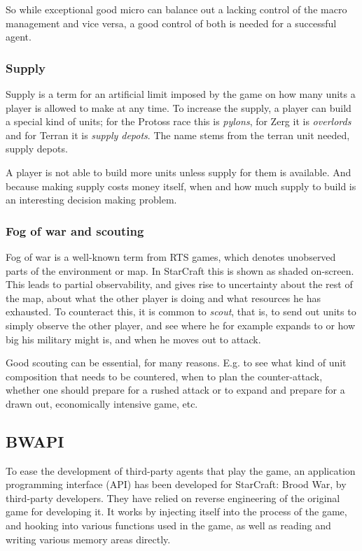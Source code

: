 So while exceptional good micro can balance out a lacking control of the macro management and vice versa, a good control of both is needed for a successful agent.

\subsubsection{Supply}
Supply is a term for an artificial limit imposed by the game on how many units a player is allowed to make at any time. To increase the supply, a player can build a special kind of units; for the Protoss race this is {\em pylons}, for Zerg it is {\em overlords} and for Terran it is {\em supply depots}. The name stems from the terran unit needed, supply depots.

A player is not able to build more units unless supply for them is available. And because making supply costs money itself, when and how much supply to build is an interesting decision making problem.

\subsubsection{Fog of war and scouting}
Fog of war is a well-known term from RTS games, which denotes unobserved parts of the environment or map. In StarCraft this is shown as shaded on-screen. This leads to partial observability, and gives rise to uncertainty about the rest of the map, about what the other player is doing and what resources he has exhausted. To counteract this, it is common to {\em scout}, that is, to send out units to simply observe the other player, and see where he for example expands to or how big his military might is, and when he moves out to attack.

Good scouting can be essential, for many reasons. E.g. to see what kind of unit composition that needs to be countered, when to plan the counter-attack, whether one should prepare for a rushed attack or to expand and prepare for a drawn out, economically intensive game, etc.

\subsection{BWAPI}
To ease the development of third-party agents that play the game, an application programming interface (API) has been developed for StarCraft: Brood War, by third-party developers. They have relied on reverse engineering of the original game for developing it. It works by injecting itself into the process of the game, and hooking into various functions used in the game, as well as reading and writing various memory areas directly.\cite{bwapi}


